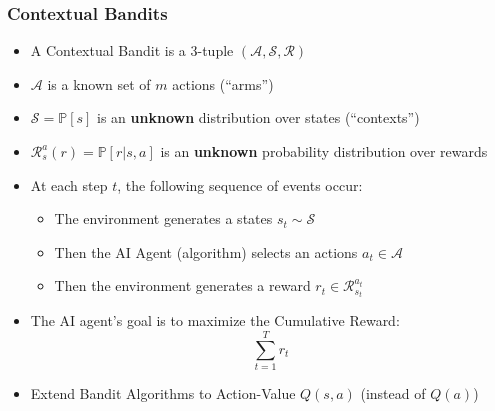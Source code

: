 \documentclass[handout]{beamer}
\begin{document}
\begin{frame}
\frametitle{Contextual Bandits}
\pause
\begin{itemize}[<+->]
\item A Contextual Bandit is a 3-tuple $(\mathcal{A}, \mathcal{S},  \mathcal{R})$
\item $\mathcal{A}$ is a known set of $m$ actions (``arms'')
\item $\mathcal{S} = \mathbb{P}[s]$ is an {\bf unknown} distribution over states (``contexts'')
\item $\mathcal{R}^a_s(r) = \mathbb{P}[r|s,a]$ is an {\bf unknown} probability distribution over rewards
\item At each step $t$, the following sequence of events occur:
\begin{itemize}
\item The environment generates a states $s_t \sim \mathcal{S}$
\item Then the AI Agent (algorithm) selects an actions $a_t \in \mathcal{A}$
\item Then the environment generates a reward $r_t \in \mathcal{R}^{a_t}_{s_t}$
\end{itemize}
\item The AI agent's goal is to maximize the Cumulative Reward:
$$\sum_{t=1}^T r_t$$
\item Extend Bandit Algorithms to Action-Value $Q(s,a)$ (instead of $Q(a)$)
\end{itemize}
\end{frame}
\end{document}

